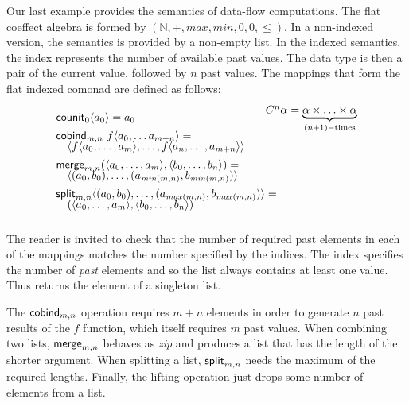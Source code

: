\begin{example}
\label{thm:semantics-indexed-list}
  
Our last example provides the semantics of data-flow computations. The flat coeffect algebra 
is formed by $(\mathbb{N}, +, \mathit{max}, \mathit{min}, 0, 0, \leq)$. In a 
non-indexed version, the semantics is provided by a non-empty list. In the indexed semantics,
the index represents the number of available past values. The data type is then a pair of 
the current value, followed by $n$ past values. The mappings that form the flat indexed comonad 
are defined as follows:
%
\begin{equation*}
\begin{array}{l}
\ident{counit}_{0}\langle a_0 \rangle = a_0
\\[0.45em]
\ident{cobind}_{m, n}~f \langle a_0, \ldots a_{m+n} \rangle = \\[-0.25em]
\quad \langle f \langle a_0, \ldots, a_m \rangle, \ldots, f \langle a_{n}, \ldots, a_{m+n} \rangle \rangle
\\[0.45em]
\ident{merge}_{m, n} (\langle a_0, \ldots, a_m \rangle, \langle b_0, \ldots, b_n\rangle) = \\[-0.25em]
\quad \langle (a_0, b_0), \ldots, (a_{\mathit{min}(m,n)}, b_{\mathit{min}(m,n)}) \rangle
\\[0.45em]
\ident{split}_{m, n} \langle (a_0, b_0), \ldots, (a_{\mathit{max}(m,n)}, b_{\mathit{max}(m,n)}) \rangle = \\[-0.25em]
\quad (\langle a_0, \ldots, a_m \rangle, \langle b_0, \ldots, b_n\rangle)
\end{array}
\begin{array}{l}
\hspace{-2em}\ctyp{n}{\alpha} = \underbrace{\alpha \times \ldots \times \alpha}_{(n+1)-\textnormal{times}}\\[8em]
~\\
\end{array}
\end{equation*}
\end{example}

\noindent
The reader is invited to check that the number of required past elements in each of the mappings
matches the number specified by the indices. The index specifies the number of \emph{past} elements
and so the list always contains at least one value. Thus  returns the element of a
singleton list.

The $\textnormal{\sffamily cobind}_{m,n}$ operation requires $m + n$ elements in order to generate $n$ past results 
of the $f$ function, which itself requires $m$ past values. When combining two lists, 
$\textnormal{\sffamily merge}_{m,n}$ behaves as \emph{zip} and produces a list that has the length of the shorter 
argument. When splitting a list, $\textnormal{\sffamily split}_{m, n}$ needs the maximum of the required lengths. 
Finally, the lifting operation just drops some number of elements from a list.


